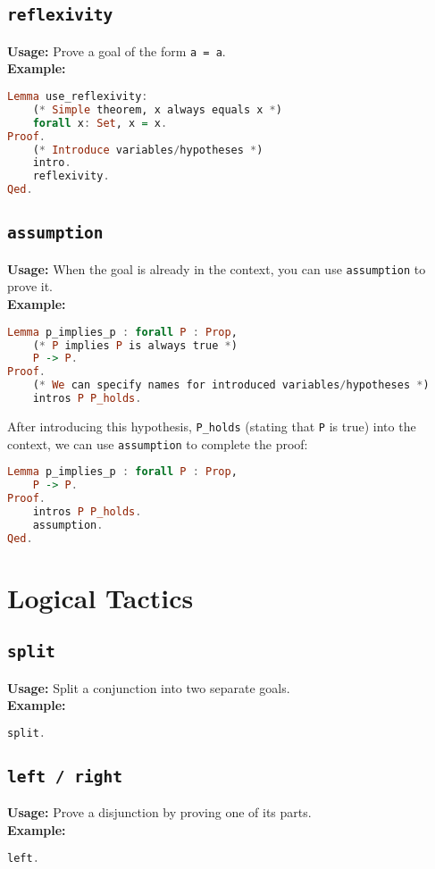 \documentclass{article}
\begin{document}
\subsection{\texttt{reflexivity}}
\textbf{Usage:} Prove a goal of the form \texttt{a = a}. \\
\textbf{Example:}
\begin{lstlisting}[language=haskell]
    Lemma use_reflexivity:
    (* Simple theorem, x always equals x *)
    forall x: Set, x = x.
Proof.
    (* Introduce variables/hypotheses *)
    intro.
    reflexivity.
Qed.
\end{lstlisting}

\subsection{\texttt{assumption}}
\textbf{Usage:} When the goal is already in the context, you can use \texttt{assumption} to prove it.\\
\textbf{Example:}
\begin{lstlisting}[language=haskell]
    Lemma p_implies_p : forall P : Prop,
    (* P implies P is always true *)
    P -> P.
Proof.
    (* We can specify names for introduced variables/hypotheses *)
    intros P P_holds.
\end{lstlisting}
After introducing this hypothesis, \texttt{P_holds} (stating that \texttt{P} is true) into the context, we can use \texttt{assumption} to complete the proof:
\begin{lstlisting}[language=haskell]
    Lemma p_implies_p : forall P : Prop,
    P -> P.
Proof.
    intros P P_holds.
    assumption.
Qed.
\end{lstlisting}

\section{Logical Tactics}
\subsection{\texttt{split}}
\textbf{Usage:} Split a conjunction into two separate goals. \\
\textbf{Example:}
\begin{lstlisting}[language=haskell]
split.
\end{lstlisting}

\subsection{\texttt{left / right}}
\textbf{Usage:} Prove a disjunction by proving one of its parts. \\
\textbf{Example:}
\begin{lstlisting}[language=haskell]
left.
\end{lstlisting}
\end{document}
